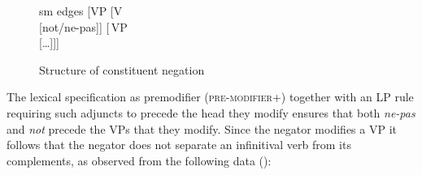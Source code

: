 \documentclass[output=paper,biblatex,babelshorthands,newtxmath,draftmode,colorlinks,citecolor=brown]{langscibook}
\begin{document}
\begin{exe}
\begin{xlist}
\begin{exe}
\begin{xlist}
\begin{figure}
	\begin{forest}
		sm edges
		[VP
			[V\\
					[not/ne-pas]]
			[\,VP\\
					[\ldots]]]
	\end{forest}
\caption{Structure of constituent negation}\label{negation-not-vp-mod}
\end{figure}
\noindent
The lexical specification as premodifier (\textsc{pre-modifier}+) together with an LP rule requiring
such adjuncts to precede the head they modify \crossrefchapterp[\page \pageref{lp-pre-modifier}]{order} ensures that
both \textit{ne-pas} and \textit{not} precede the VPs that they modify.
Since the negator modifies a VP it follows that the negator does not separate an infinitival verb
from its complements, as observed from the following data (\citealp[]{KS:02}):

\eal
{} \label{negation-35a}
 \label{negation-35b}
\zl

\eal
{} \label{negation-34a}
 \label{negation-34b}
\zl


\end{xlist}
\end{exe}
\end{xlist}
\end{exe}
\end{document}
